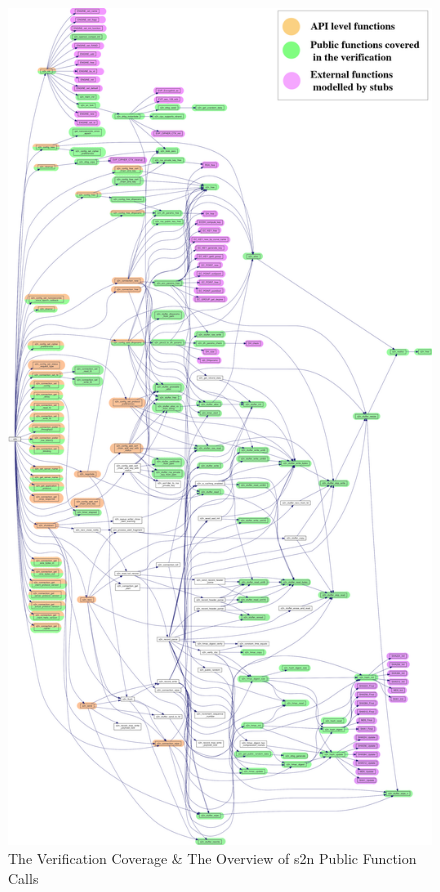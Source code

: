 \begin{figure}[tp]
    \centering
    \includegraphics[height=0.95\textheight,keepaspectratio]{./contents/images/call-graph-color.png}
    \caption{The Verification Coverage \& The Overview of s2n Public Function Calls}
    \label{fig:tvcntospfc}
\end{figure}


